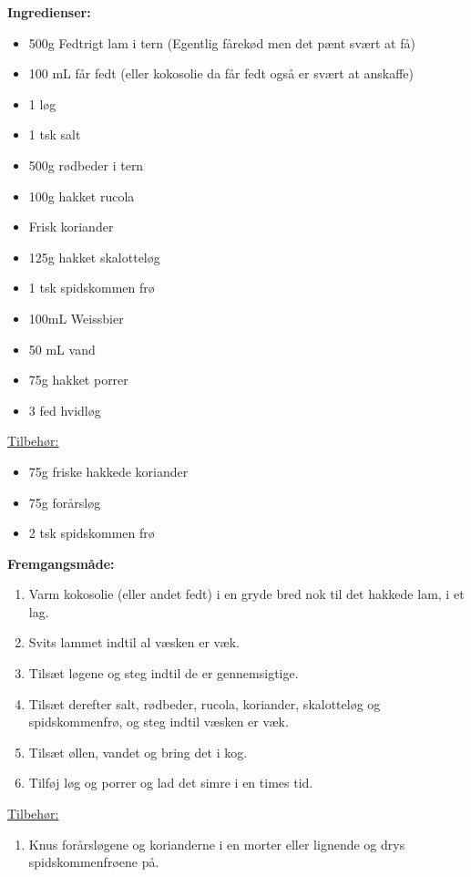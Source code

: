 \documentclass{book}
\begin{document}
\begin{minipage}[t]{0.5\textwidth}
\textbf{Ingredienser:}
\begin{itemize}
    \item 500g Fedtrigt lam i tern (Egentlig fårekød men det pænt svært at få)
    \item 100 mL får fedt (eller kokosolie da får fedt også er svært at anskaffe)
    \item 1 løg
    \item 1 tsk salt
    \item 500g rødbeder i tern
    \item 100g hakket rucola
    \item Frisk koriander
    \item 125g hakket skalotteløg
    \item 1 tsk spidskommen frø
    \item 100mL Weissbier
    \item 50 mL vand
    \item 75g hakket porrer
    \item 3 fed hvidløg
\end{itemize}
\underline{Tilbehør:}
\begin{itemize}
    \item 75g friske hakkede koriander
    \item 75g forårsløg
    \item 2 tsk spidskommen frø
\end{itemize}
\end{minipage}%
\begin{minipage}[t]{0.5\textwidth}
\textbf{Fremgangsmåde:}
\begin{enumerate}
    \item Varm kokosolie (eller andet fedt) i en gryde bred nok til det hakkede lam, i et lag.
    \item Svits lammet indtil al væsken er væk.
    \item Tilsæt løgene og steg indtil de er gennemsigtige.
    \item Tilsæt derefter salt, rødbeder, rucola, koriander, skalotteløg og spidskommenfrø, og steg indtil væsken er væk.
    \item Tilsæt øllen, vandet og bring det i kog.
    \item Tilføj løg og porrer og lad det simre i en times tid.
\end{enumerate}
\underline{Tilbehør:}
\begin{enumerate}
    \item Knus forårsløgene og korianderne i en morter eller lignende og drys spidskommenfrøene på.
\end{enumerate}
\end{minipage}
\end{document}
